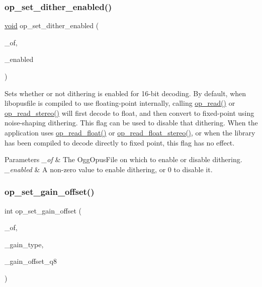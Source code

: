 \subsubsection{\texorpdfstring{op\_set\_dither\_enabled()}{op\_set\_dither\_enabled()}}
{\footnotesize\ttfamily \mbox{\hyperlink{_s_d_l__opengles2__gl2ext_8h_ae5d8fa23ad07c48bb609509eae494c95}{void}} op\+\_\+set\+\_\+dither\+\_\+enabled (\begin{DoxyParamCaption}\item[{Ogg\+Opus\+File $\ast$}]{\+\_\+of,  }\item[{int}]{\+\_\+enabled }\end{DoxyParamCaption})}

Sets whether or not dithering is enabled for 16-\/bit decoding. By default, when {\ttfamily libopusfile} is compiled to use floating-\/point internally, calling \mbox{\hyperlink{group__stream__decoding_ga963c917749335e29bb2b698c1cb20a10}{op\+\_\+read()}} or \mbox{\hyperlink{group__stream__decoding_gaaca17ad3fd6430dc8fd43308149428eb}{op\+\_\+read\+\_\+stereo()}} will first decode to float, and then convert to fixed-\/point using noise-\/shaping dithering. This flag can be used to disable that dithering. When the application uses \mbox{\hyperlink{group__stream__decoding_ga73493002d84a234f5e19b70f1dddbe2a}{op\+\_\+read\+\_\+float()}} or \mbox{\hyperlink{group__stream__decoding_ga9736f96563500c0978f56f0fd6bdad83}{op\+\_\+read\+\_\+float\+\_\+stereo()}}, or when the library has been compiled to decode directly to fixed point, this flag has no effect. 
\begin{DoxyParams}{Parameters}
{\em \+\_\+of} & The {\ttfamily Ogg\+Opus\+File} on which to enable or disable dithering. \\
\hline
{\em \+\_\+enabled} & A non-\/zero value to enable dithering, or 0 to disable it. \\
\hline
\end{DoxyParams}
\mbox{\label{group__stream__decoding_ga7df927613ccf57996319678e08513289}} 
\subsubsection{\texorpdfstring{op\_set\_gain\_offset()}{op\_set\_gain\_offset()}}
{\footnotesize\ttfamily int op\+\_\+set\+\_\+gain\+\_\+offset (\begin{DoxyParamCaption}\item[{Ogg\+Opus\+File $\ast$}]{\+\_\+of,  }\item[{int}]{\+\_\+gain\+\_\+type,  }\item[{\mbox{\hyperlink{opus__types_8h_aa4d309d6f80b99dbabebc8f98879ab9a}{opus\+\_\+int32}}}]{\+\_\+gain\+\_\+offset\+\_\+q8 }\end{DoxyParamCaption})}

